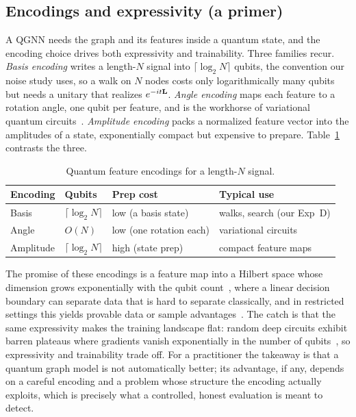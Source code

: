 \subsection{Encodings and expressivity (a primer)}
A QGNN needs the graph and its features inside a quantum state, and the encoding choice
drives both expressivity and trainability. Three families recur. \emph{Basis encoding}
writes a length-$N$ signal into $\lceil\log_2 N\rceil$ qubits, the convention our
noise study uses, so a walk on $N$ nodes costs only logarithmically many qubits but needs
a unitary that realizes $e^{-it\mathbf{L}}$. \emph{Angle encoding} maps each feature to a
rotation angle, one qubit per feature, and is the workhorse of variational quantum
circuits~\cite{mitarai2018qcl,farhi2018classification}. \emph{Amplitude encoding} packs a
normalized feature vector into the amplitudes of a state, exponentially compact but
expensive to prepare. Table~\ref{tab:encodings} contrasts the three.

\begin{table}[t]
\centering
\caption{Quantum feature encodings for a length-$N$ signal.}
\label{tab:encodings}
\renewcommand{\arraystretch}{1.25}
\footnotesize
\begin{tabular}{@{}p{}p{}p{}p{}@{}}
\toprule
Encoding & Qubits & Prep cost & Typical use \\
\midrule
Basis & $\lceil\log_2 N\rceil$ & low (a basis state) & walks, search (our Exp~D) \\
Angle & $O(N)$ & low (one rotation each) & variational circuits \\
Amplitude & $\lceil\log_2 N\rceil$ & high (state prep) & compact feature maps \\
\bottomrule
\end{tabular}
\end{table} The promise of these encodings is a feature map into a Hilbert
space whose dimension grows exponentially with the qubit
count~\cite{schuld2019featurespace,havlicek2019supervised,schuld2018book}, where a linear
decision boundary can separate data that is hard to separate classically, and in
restricted settings this yields provable data or sample
advantages~\cite{huang2021power,liu2021rigorous,abbas2021power}. The catch is that the
same expressivity makes the training landscape flat: random deep circuits exhibit barren
plateaus where gradients vanish exponentially in the number of
qubits~\cite{mcclean2018barren}, so expressivity and trainability trade off. For a
practitioner the takeaway is that a quantum graph model is not automatically better; its
advantage, if any, depends on a careful encoding and a problem whose structure the
encoding actually exploits, which is precisely what a controlled, honest evaluation is
meant to detect.

